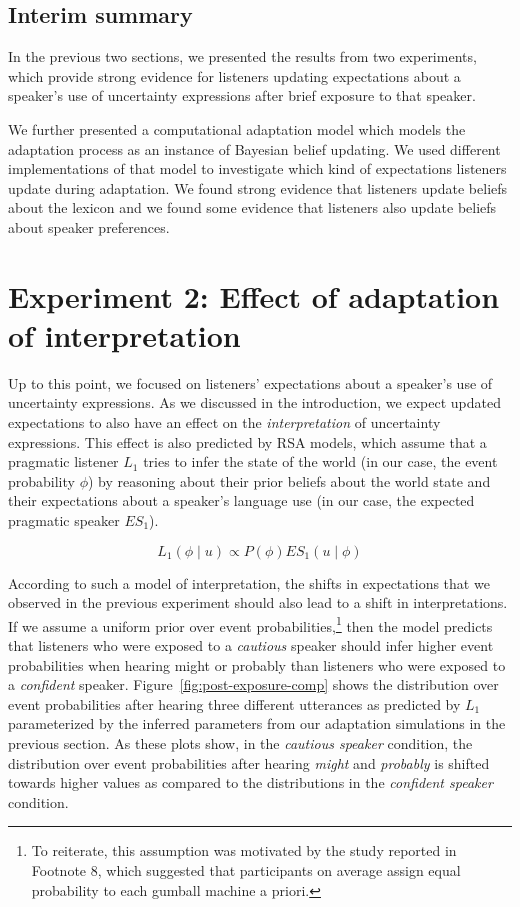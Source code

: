 \documentclass[lucida,biblatex]{sp} %
\begin{document}
\subsection{Interim summary}

In the previous two sections, we presented the results from two experiments, which provide strong evidence for
listeners updating expectations about a speaker's use of uncertainty expressions after brief
exposure to that speaker. 

We further presented a computational adaptation model which models the adaptation
process as an instance of Bayesian belief updating. We used different implementations
of that model to investigate which kind of expectations listeners update during adaptation.
We found strong evidence that listeners update beliefs about the lexicon and 
we found some evidence that
listeners also update beliefs about speaker preferences.

\section{Experiment 2: Effect of adaptation of interpretation}
\label{sec:exp-model-interpretation}


Up to this point, we focused on listeners' expectations about a speaker's use of uncertainty expressions. As we discussed
in the introduction, we expect updated expectations to also have an effect on the \emph{interpretation} of uncertainty expressions. This
effect is also predicted by RSA models,  which assume that a pragmatic listener $L_1$ tries to infer the state of the world (in our case, the event probability $\phi$) by reasoning
about their prior beliefs about the world state and their expectations about a speaker's language use (in our case, the expected pragmatic speaker $ES_{1}$).

$$ L_1(\phi \mid u) \propto P(\phi) ES_1(u \mid \phi)$$

According to such a model of interpretation, the shifts in expectations that we observed in the previous experiment should also lead to a shift in interpretations. 
If we assume a uniform prior over event probabilities,\footnote{To reiterate, this assumption was motivated by the study reported in Footnote 8, which suggested that participants on average assign equal probability to each gumball machine a priori.} then the model predicts that listeners who were exposed to a \textit{cautious} speaker should infer 
higher event probabilities when hearing {\sc might} or {\sc probably} than listeners who were exposed to a \textit{confident} speaker. Figure~\ref{fig:post-exposure-comp}
shows the distribution over event probabilities after hearing three different utterances as predicted by $L_1$ parameterized by the inferred parameters from our
adaptation simulations in the previous section. As these plots show, in the \textit{cautious speaker} condition, the distribution over event probabilities after hearing \textit{might} 
and \textit{probably} is shifted towards higher values as compared to the distributions in the \textit{confident speaker} condition. 
\end{document}
